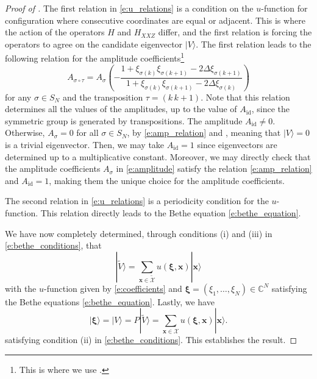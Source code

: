 \documentclass[a4paper,11pt]{article}
\theoremstyle{definition}
\begin{document}
\begin{proof} [Proof of ]
The first relation in \eqref{e:u_relations} is a condition on the $u$-function for configuration where consecutive coordinates are equal or adjacent. This is where the action of the operators $H$ and $H_{XXZ}$ differ, and the first relation is forcing the operators to agree on the candidate eigenvector $|V\rangle$. The first relation leads to the following relation for the amplitude coefficients\footnote{This is where we use .}
\begin{equation}\label{e:amp_relation}
    A_{\sigma \circ \tau} = A_{\sigma}\left( - \frac{1 + \xi_{\sigma(k)} \xi_{\sigma(k+1)} - 2 \Delta \xi_{\sigma(k+1)}}{1 + \xi_{\sigma(k)} \xi_{\sigma(k+1)} - 2 \Delta \xi_{\sigma(k)}}\right)
\end{equation}
for any $\sigma \in S_N$ and the transposition $\tau = (k\, k+1)$. Note that this relation determines all the values of the amplitudes, up to the value of $A_{\mathrm{id}}$, since the symmetric group is generated by transpositions. The amplitude $A_{\mathrm{id}} \neq 0$. Otherwise, $A_{\sigma} = 0$ for all $\sigma \in S_N$, by \eqref{e:amp_relation} and , meaning that $|V \rangle = 0$ is a trivial eigenvector. Then, we may take $A_{\mathrm{id}} =1$ since eigenvectors are determined up to a multiplicative constant. Moreover, we may directly check that the amplitude coefficients $A_{\sigma}$ in \eqref{e:amplitude} satisfy the relation \eqref{e:amp_relation} and $A_{\mathrm{id}} =1$, making them the unique choice for the amplitude coefficients.

The second relation in \eqref{e:u_relations} is a periodicity condition for the $u$-function. This relation directly leads to the Bethe equation \eqref{e:bethe_equation}.

We have now completely determined, through conditions (i) and (iii) in \eqref{e:bethe_conditions}, that
\begin{equation}
    |\tilde{V} \rangle = \sum_{\mathbf{x} \in \tilde{\mathcal{X}}} u(\boldsymbol{\xi}, \mathbf{x}) |\mathbf{x} \rangle
\end{equation}
with the $u$-function given by \eqref{e:coefficients} and $\boldsymbol{\xi} = (\xi_1, \dots, \xi_N) \in \mathbb{C}^N$ satisfying the Bethe equations \eqref{e:bethe_equation}. Lastly, we have
\begin{equation}
    |\boldsymbol{\xi} \rangle = |V \rangle = P |\tilde{V} \rangle = \sum_{\mathbf{x} \in \mathcal{X}} u(\boldsymbol{\xi}, \mathbf{x}) |\mathbf{x} \rangle.
\end{equation}
satisfying condition (ii) in \eqref{e:bethe_conditions}. This establishes the result. 
\end{proof}
\end{document}
